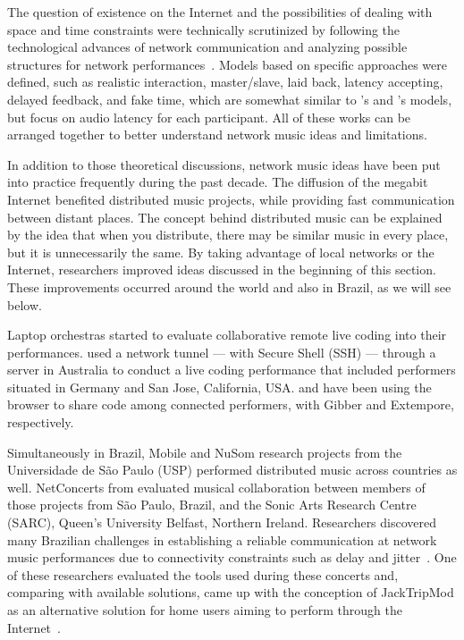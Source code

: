 The question of existence on the Internet and the possibilities of dealing with space and time constraints were technically scrutinized by following the technological advances of network communication and analyzing possible structures for network performances~\citep{Carot2007network,Carot2007networked,Carot2008distributed,Carot2009fundamentals,Carot2010low}.
Models based on specific approaches were defined, such as realistic interaction, master/slave, laid back, latency accepting, delayed feedback, and fake time, which are somewhat similar to 's and 's models, but focus on audio latency for each participant.
All of these works can be arranged together to better understand network music ideas and limitations. 

In addition to those theoretical discussions, network music ideas have been put into practice frequently during the past decade.
The diffusion of the megabit Internet benefited distributed music projects, while providing fast communication between distant places.
The concept behind distributed music can be explained by the idea that when you distribute, there may be similar music in every place, but it is unnecessarily the same.
By taking advantage of local networks or the Internet, researchers improved ideas discussed in the beginning of this section.
These improvements occurred around the world and also in Brazil, as we will see below.

Laptop orchestras started to evaluate collaborative remote live coding into their performances.
\cite{Swift2014networked} used a network tunnel --- with Secure Shell (SSH) --- through a server in Australia to conduct a live coding performance that included performers situated in Germany and San Jose, California, USA.
\cite{Roberts2012gibberlivecoding} and \cite{Ogborn2014live} have been using the browser to share code among connected performers, with Gibber and Extempore, respectively.

Simultaneously in Brazil, Mobile and NuSom research projects from the Universidade de São Paulo (USP) performed distributed music across countries as well.
NetConcerts from \citep{Arango2014thesis} evaluated musical collaboration between members of those projects from São Paulo, Brazil, and the Sonic Arts Research Centre (SARC), Queen's University Belfast, Northern Ireland.
Researchers discovered many Brazilian challenges in establishing a reliable communication at network music performances due to connectivity constraints such as delay and jitter~\citep{Arango2013challenges,Arango2014thesis}.
One of these researchers evaluated the tools used during these concerts and, comparing with available solutions, came up with the conception of JackTripMod as an alternative solution for home users aiming to perform through the Internet~\citep{Tomiyoshi2013thesis}.

